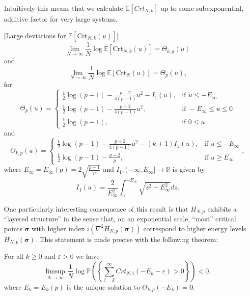 Intuitively this means that we calculate $\mathbb E[Crt_{N,k}]$ up to some subexponential, additive factor for very large systems.

\begin{theorem}\label{thm:1}[Large deviations for ${\mathbb E[\text{Crt}_{N,k}(u)]}$]
	\begin{equation}\label{thm:2.5}
		\lim_{N\rightarrow\infty}\frac{1}{N}\log\mathbb E[\text{Crt}_{N,k}(u)] = \Theta_{k,p}(u)
	\end{equation}
	and
	\begin{equation}\label{thm:2.8}
		\lim_{N\rightarrow\infty}\frac{1}{N}\log\mathbb E[\text{Crt}_N(u)] = \Theta_p(u),
	\end{equation}
	for $$\Theta_p(u)=\begin{cases}
						\frac{1}{2}\log(p-1)-\frac{p-2}{4(p-1)}u^2-I_1(u), &\mbox{if } u\leq-E_\infty \\
						\frac{1}{2}\log(p-1)-\frac{p-2}{4(p-1)}u^2, &\mbox{if } -E_\infty\leq u\leq 0\\ 
						\frac{1}{2}\log(p-1), &\mbox{if } 0\leq u
					  \end{cases}$$
	and
	$$\Theta_{k,p}(u)=\begin{cases}
						\frac{1}{2}\log(p-1)-\frac{p-2}{4(p-1)}u^2-(k+1)I_1(u), &\mbox{if } u\leq-E_\infty \\
						\frac{1}{2}\log(p-1)-\frac{p-2}{p}, &\mbox{if } u \geq E_\infty
					  \end{cases},$$
	where $E_\infty=E_\infty(p)=2\sqrt{\frac{p-1}{p}}$ and $I_1:(-\infty,E_\infty]\rightarrow\mathbb R$ is given by $$I_1(u)=\frac{2}{E_\infty^2}\int_u^{-E_\infty}\sqrt{z^2-E_\infty^2}dz.$$
\end{theorem}
One particularly interesting consequence of this result is that $H_{N,p}$ exhibits a ``layered structure'' in the sense that, on an exponential scale, ``most'' critical points $\bm\sigma$ with higher index $i(\nabla^2 H_{N,p}(\bm\sigma))$ correspond to higher energy levels $H_{N,p}(\bm\sigma)$. This statement is made precise with the following theorem:

\begin{theorem}
	For all $k\geq 0$ and $\varepsilon>0$ we have
	\begin{equation}\label{thm:2.15}
		\limsup_{N\rightarrow\infty}\frac{1}{N}\log\mathbb P\left(\left\{\sum_{i=k}^\infty Crt_{N,i}(-E_k-\varepsilon)>0\right\}\right)<0,
	\end{equation}
	where $E_k=E_k(p)$ is the unique solution to $\Theta_{k,p}(-E_k)=0$.
\end{theorem}

